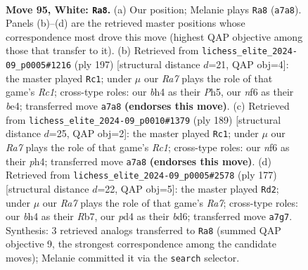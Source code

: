 \documentclass[11pt]{article}
\begin{document}
\clearpage

\begin{figure}[p]\centering
\begin{subfigure}{0.46\textwidth}\centering
\resizebox{\linewidth}{!}{%
\newchessgame
\chessboard[
  setfen={8/R7/5n1p/4pk2/1K1p3b/8/2r5/8 w - - 8 95},
  showmover=false,
  pgfstyle=straightmove, color=movearrow, markmove={a7-a8}
]}
\caption{}
\end{subfigure}\hfill
\begin{subfigure}{0.46\textwidth}\centering
\resizebox{\linewidth}{!}{%
\newchessgame
\chessboard[
  setfen={2r5/4k3/1R4P1/4K2p/4B2P/8/8/8 b - - 2 99},
  showmover=false,
  pgfstyle=straightmove, color=movearrow, markmove={c8-c1}
]}
\caption{}
\end{subfigure}
\\[4pt]
\begin{subfigure}{0.46\textwidth}\centering
\resizebox{\linewidth}{!}{%
\newchessgame
\chessboard[
  setfen={2r5/8/4k3/1R6/6KP/5P2/8/8 b - - 2 95},
  showmover=false,
  pgfstyle=straightmove, color=movearrow, markmove={c8-c1}
]}
\caption{}
\end{subfigure}\hfill
\begin{subfigure}{0.46\textwidth}\centering
\resizebox{\linewidth}{!}{%
\newchessgame
\chessboard[
  setfen={6k1/1r6/3B4/4PK1B/5N2/8/r7/8 b - - 52 89},
  showmover=false,
  pgfstyle=straightmove, color=movearrow, markmove={a2-d2}
]}
\caption{}
\end{subfigure}
\caption{\textbf{Move 95, White: \texttt{Ra8}.} (a) Our position; Melanie plays \texttt{Ra8} (\texttt{a7a8}). Panels (b)--(d) are the retrieved master positions whose correspondence most drove this move (highest QAP objective among those that transfer to it). (b) Retrieved from \texttt{lichess\_elite\_2024-09\_p0005\#1216} (ply 197) [structural distance $d$=21, QAP obj=4]: the master played \texttt{Rc1}; under $\mu$ our \emph{Ra7} plays the role of that game's \emph{Rc1}; cross-type roles: our \emph{b}h4 as their \emph{P}h5, our \emph{n}f6 as their \emph{b}e4; transferred move \texttt{a7a8} \textbf{(endorses this move)}. (c) Retrieved from \texttt{lichess\_elite\_2024-09\_p0010\#1379} (ply 189) [structural distance $d$=25, QAP obj=2]: the master played \texttt{Rc1}; under $\mu$ our \emph{Ra7} plays the role of that game's \emph{Rc1}; cross-type roles: our \emph{n}f6 as their \emph{p}h4; transferred move \texttt{a7a8} \textbf{(endorses this move)}. (d) Retrieved from \texttt{lichess\_elite\_2024-09\_p0005\#2578} (ply 177) [structural distance $d$=22, QAP obj=5]: the master played \texttt{Rd2}; under $\mu$ our \emph{Ra7} plays the role of that game's \emph{Ra7}; cross-type roles: our \emph{b}h4 as their \emph{R}b7, our \emph{p}d4 as their \emph{b}d6; transferred move \texttt{a7g7}. Synthesis: 3 retrieved analogs transferred to \texttt{Ra8} (summed QAP objective 9, the strongest correspondence among the candidate moves); Melanie committed it via the \texttt{search} selector.}
\label{fig:thought-m188}
\end{figure}
\end{document}
